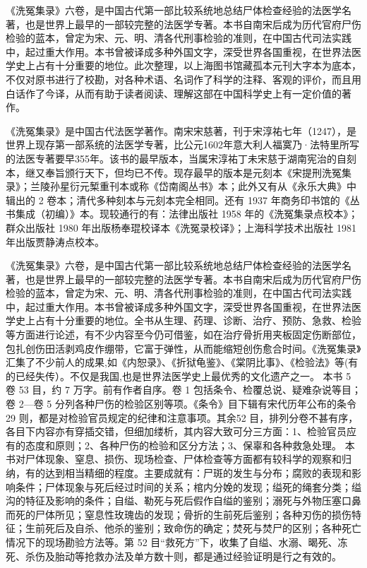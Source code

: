\documentclass[12pt,UTF8]{ctexbook}
\begin{document}
《洗冤集录》六卷，是中国古代第一部比较系统地总结尸体检查经验的法医学名著，也是世界上最早的一部较完整的法医学专著。本书自南宋后成为历代官府尸伤检验的蓝本，曾定为宋、元、明、清各代刑事检验的准则，在中国古代司法实践中，起过重大作用。本书曾被译成多种外国文字，深受世界各国重视，在世界法医学史上占有十分重要的地位。此次整理，以上海图书馆藏孤本元刊大字本为底本，不仅对原书进行了校勘，对各种术语、名词作了科学的注释、客观的评价，而且用白话作了今译，从而有助于读者阅读、理解这部在中国科学史上有一定价值的著作。

《洗冤集录》是中国古代法医学著作。南宋宋慈著，刊于宋淳祐七年（1247），是世界上现存第一部系统的法医学专著，比公元1602年意大利人福寞乃·法特里所写的法医专著要早355年。该书的最早版本，当属宋淳祐丁未宋慈于湖南宪治的自刻本，继又奉旨颁行天下，但均已不传。现存最早的版本是元刻本《宋提刑洗冤集录》；兰陵孙星衍元椠重刊本或称《岱南阁丛书》本；此外又有从《永乐大典》中辑出的 2 卷本；清代多种刻本与元刻本完全相同。还有 1937 年商务印书馆的《丛书集成（初编）》本。现较通行的有：法律出版社 1958 年的《洗冤集录点校本》；群众出版社 1980 年出版杨奉琨校译本《洗冤录校译》；上海科学技术出版社 1981 年出版贾静涛点校本。

《洗冤集录》六卷，是中国古代第一部比较系统地总结尸体检查经验的法医学名著，也是世界上最早的一部较完整的法医学专著。本书自南宋后成为历代官府尸伤检验的蓝本，曾定为宋、元、明、清各代刑事检验的准则，在中国古代司法实践中，起过重大作用。本书曾被译成多种外国文字，深受世界各国重视，在世界法医学史上占有十分重要的地位。全书从生理、药理、诊断、治疗、预防、急救、检验等方面进行论述，有不少内容至今仍可借鉴，如在治疗骨折用夹板固定伤断部位，包扎创伤田活剥鸡皮作绷带，它富于弹性，从而能缩短创伤愈合时间。《洗冤集录》汇集了不少前人的成果,如《内恕录》、《折狱龟鉴》、《棠阴比事》、《检验法》等(有的已经失传）。不仅是我国,也是世界法医学史上最优秀的文化遗产之一。
本书 5 卷 53 目，约 7 万字。前有作者自序。卷 1 包括条令、检覆总说、疑难杂说等目；卷 2—卷 5 分列各种尸伤的检验区别等项。《条令》目下辑有宋代历年公布的条令 29 则，都是对检验官员规定的纪律和注意事项。其余52 目，排列分卷不甚有序，各目下内容亦有穿插交错，但细加缕析，其内容大致可分三方面：1、检验官员应有的态度和原则；2、各种尸伤的检验和区分方法；3、保辜和各种救急处理。
本书对尸体现象、窒息、损伤、现场检查、尸体检查等方面都有较科学的观察和归纳，有的达到相当精细的程度。主要成就有：尸斑的发生与分布；腐败的表现和影响条件；尸体现象与死后经过时间的关系；棺内分娩的发现；缢死的绳套分类；缢沟的特征及影响的条件；自缢、勒死与死后假作自缢的鉴别；溺死与外物压塞口鼻而死的尸体所见；窒息性玫瑰齿的发现；骨折的生前死后鉴别；各种刃伤的损伤特征；生前死后及自杀、他杀的鉴别；致命伤的确定；焚死与焚尸的区别；各种死亡情况下的现场勘验方法等。第 52 目“救死方”下，收集了自缢、水溺、暍死、冻死、杀伤及胎动等抢救办法及单方数十则，都是通过经验证明是行之有效的。
\end{document}
